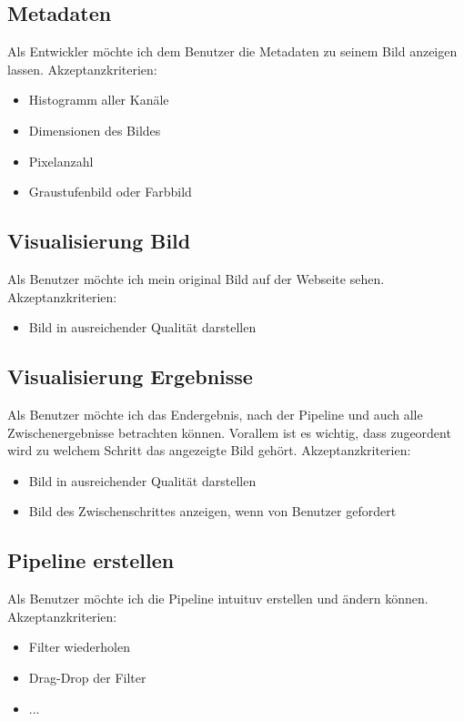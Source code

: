 \documentclass[conference]{IEEEtran}
\begin{document}
\subsection{Metadaten}
Als Entwickler möchte ich dem Benutzer die Metadaten zu seinem Bild anzeigen lassen.
Akzeptanzkriterien: 
\begin{itemize}
	\item Histogramm aller Kanäle
	\item Dimensionen des Bildes
	\item Pixelanzahl
	\item Graustufenbild oder Farbbild
\end{itemize}

\subsection{Visualisierung Bild}
Als Benutzer möchte ich mein original Bild auf der Webseite sehen.
Akzeptanzkriterien: 
\begin{itemize}
	\item Bild in ausreichender Qualität darstellen
\end{itemize}

\subsection{Visualisierung Ergebnisse}
Als Benutzer möchte ich das Endergebnis, nach der Pipeline und auch alle Zwischenergebnisse betrachten können. Vorallem ist es wichtig, dass zugeordent wird zu welchem Schritt das angezeigte Bild gehört.
Akzeptanzkriterien: 
\begin{itemize}
	\item Bild in ausreichender Qualität darstellen
	\item Bild des Zwischenschrittes anzeigen, wenn von Benutzer gefordert
\end{itemize}

\subsection{Pipeline erstellen}
Als Benutzer möchte ich die Pipeline intuituv erstellen und ändern können.
Akzeptanzkriterien:
\begin{itemize}
	\item Filter wiederholen
	\item Drag-Drop der Filter
	\item ...
\end{itemize}
\end{document}
